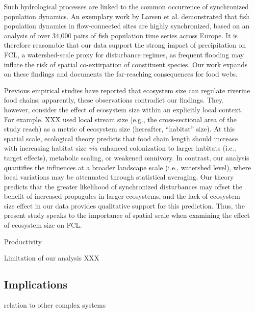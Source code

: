 \documentclass[11pt, class=article, crop=false]{standalone}
\begin{document}
Such hydrological processes are linked to the common occurrence of synchronized population dynamics.
An exemplary work by Larsen et al. demonstrated that fish population dynamics in flow-connected sites are highly synchronized, based on an analysis of over 34,000 pairs of fish population time series across Europe.
It is therefore reasonable that our data support the strong impact of precipitation on FCL, a watershed-scale proxy for disturbance regimes, as frequent flooding may inflate the risk of spatial co-extirpation of constituent species.
Our work expands on these findings and documents the far-reaching consequences for food webs.

Previous empirical studies have reported that ecosystem size can regulate riverine food chains;  apparently, these observations contradict our findings.
They, however, consider the effect of ecosystem size within an explicitly local context.
For example, XXX used local stream size (e.g., the cross-sectional area of the study reach) as a metric of ecosystem size (hereafter, ``habitat'' size).
At this spatial scale, ecological theory predicts that food chain length should increase with increasing habitat size \textit{via} enhanced colonization to larger habitats (i.e., target effects), metabolic scaling, or weakened omnivory.
In contrast, our analysis quantifies the influences at a broader landscape scale (i.e., watershed level), where local variations may be attenuated through statistical averaging. 
Our theory predicts that the greater likelihood of synchronized disturbances may offset the benefit of increased propagules in larger ecosystems, and the lack of ecosystem size effect in our data provides qualitative support for this prediction.
Thus, the present study speaks to the importance of spatial scale when examining the effect of ecosystem size on FCL.

Productivity

Limitation of our analysis XXX

\subsection{Implications}

relation to other complex systems
\end{document}
